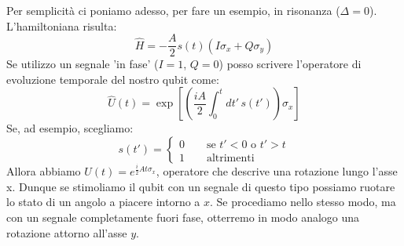 \noindent {}
\vspace{0.5cm}
\noindent Per semplicità ci poniamo adesso, per fare un esempio, in risonanza ($\Delta=0$).
L'hamiltoniana risulta:
\begin{equation*}
    \hat H = -\frac{A}{2}s(t) \left(I\sigma_x + Q \sigma_y \right)
\end{equation*}
Se utilizzo un segnale 'in fase' ($I=1$, $Q=0$) posso scrivere l'operatore di evoluzione temporale del nostro qubit come:
\begin{equation*}
    \hat U (t) = \exp\left[ \left(\frac{iA}{2} \int_0^t dt'\, s(t') \right) \sigma_x \right]
\end{equation*}
Se, ad esempio, scegliamo:
\begin{equation*}
    s(t') = \begin{cases} 0 \qquad \text{se $t' < 0$ o $t'> t$} \\ 1 \qquad \text{altrimenti} \end{cases}
\end{equation*}
Allora abbiamo $\hat U (t) = e^{\frac{i}{2}A t \sigma_x}$, operatore che descrive una rotazione lungo l'asse x. Dunque se stimoliamo il qubit con un segnale di questo tipo possiamo ruotare lo stato di un angolo a piacere intorno a $x$. Se procediamo nello stesso modo, ma con un segnale completamente fuori fase, otterremo in modo analogo una rotazione attorno all'asse $y$.

